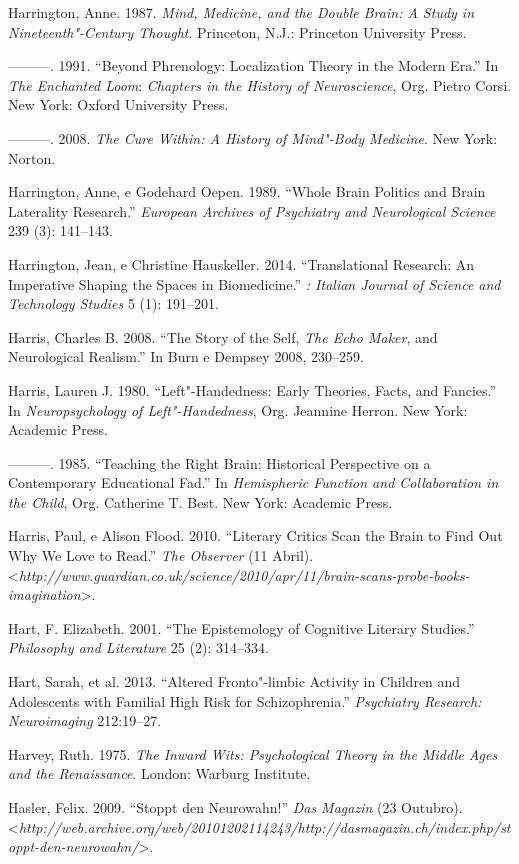 Harrington, Anne. 1987. \emph{Mind, Medicine, and the Double Brain: A
Study in Nineteenth"-Century Thought}. Princeton, N.J.: Princeton
University Press.

---------. 1991. ``Beyond Phrenology: Localization Theory in the Modern
Era.'' In \emph{The Enchanted Loom}: \emph{Chapters in the History of
Neuroscience}, Org. Pietro Corsi. New York: Oxford University Press.

---------. 2008. \emph{The Cure Within: A History of Mind"-Body
Medicine}. New York: Norton.

Harrington, Anne, e Godehard Oepen. 1989. ``Whole Brain Politics and
Brain Laterality Research.'' \emph{European Archives of Psychiatry and
Neurological Science} 239 (3): 141--143.

Harrington, Jean, e Christine Hauskeller. 2014. ``Translational
Research: An Imperative Shaping the Spaces in Biomedicine.''
\emph{: Italian Journal of Science and Technology Studies} 5
(1): 191--201.

Harris, Charles B. 2008. ``The Story of the Self, \emph{The Echo Maker},
and Neurological Realism.'' In Burn e Dempsey 2008, 230--259.

Harris, Lauren J. 1980. ``Left"-Handedness: Early Theories, Facts, and
Fancies.'' In \emph{Neuropsychology of Left"-Handedness}, Org. Jeannine
Herron. New York: Academic Press.

---------. 1985. ``Teaching the Right Brain: Historical Perspective on a
Contemporary Educational Fad.'' In \emph{Hemispheric Function and
Collaboration in the Child}, Org. Catherine T. Best. New York: Academic
Press.

Harris, Paul, e Alison Flood. 2010. ``Literary Critics Scan the Brain to
Find Out Why We Love to Read.'' \emph{The Observer} (11 Abril).
\textless{}\emph{http://www.guardian.co.uk/science/2010/apr/11/brain-scans-probe-books-imagination}\textgreater{}.

Hart, F. Elizabeth. 2001. ``The Epistemology of Cognitive Literary
Studies.'' \emph{Philosophy and Literature} 25 (2): 314--334.

Hart, Sarah, et al. 2013. ``Altered Fronto"-limbic Activity in Children
and Adolescents with Familial High Risk for Schizophrenia.''
\emph{Psychiatry Research: Neuroimaging} 212:19--27.

Harvey, Ruth. 1975. \emph{The Inward Wits: Psychological Theory in the
Middle Ages and the Renaissance}. London: Warburg Institute.

Hasler, Felix. 2009. ``Stoppt den Neurowahn!'' \emph{Das Magazin} (23
Outubro).
\textless{}\emph{http://web.archive.org/web/20101202114243/http://dasmagazin.ch/index.php/stoppt-den-neurowahn/}\textgreater{}.

